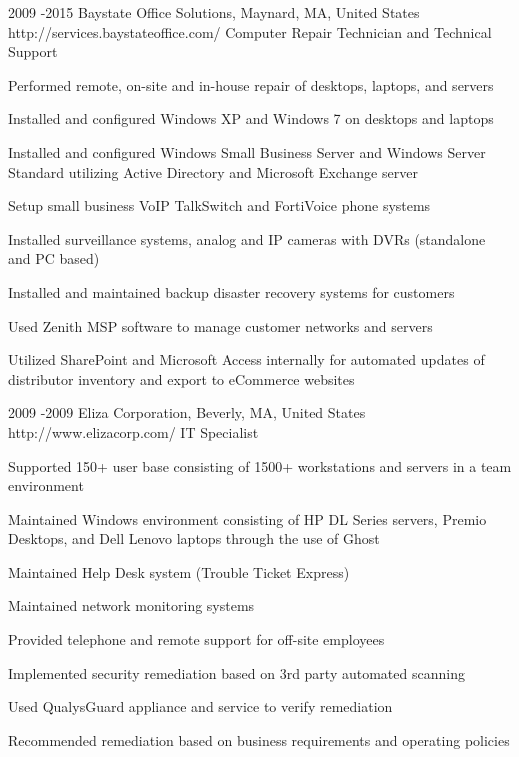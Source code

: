 \documentclass[10pt]{article} %
\begin{document}
\job
{2009 -}{2015}
{Baystate Office Solutions, Maynard, MA, United States}
{http://services.baystateoffice.com/}
{Computer Repair Technician and Technical Support}
{\begin{itemize-noindent}
\item{Performed remote, on-site and in-house repair of desktops, laptops, and servers}
\item{Installed and configured Windows XP and Windows 7 on desktops and laptops}
\item{Installed and configured Windows Small Business Server and Windows Server Standard utilizing Active Directory and Microsoft Exchange server}
\item{Setup small business VoIP TalkSwitch and FortiVoice phone systems}
\item{Installed surveillance systems, analog and IP cameras with DVRs (standalone and PC based)}
\item{Installed and maintained backup disaster recovery systems for customers}
\item{Used Zenith MSP software to manage customer networks and servers}
\item{Utilized SharePoint and Microsoft Access internally for automated updates of distributor inventory and export to eCommerce websites}
\end{itemize-noindent}}


\job
{2009 -}{2009}
{Eliza Corporation, Beverly, MA, United States}
{http://www.elizacorp.com/}
{IT Specialist}
{\begin{itemize-noindent}
\item{Supported 150+ user base consisting of 1500+ workstations and servers in a team environment}
\item{Maintained Windows environment consisting of HP DL Series servers, Premio Desktops, and Dell Lenovo laptops through the use of Ghost}
\item{Maintained Help Desk system (Trouble Ticket Express)}
\item{Maintained network monitoring systems}
\item{Provided telephone and remote support for off-site employees}
\item{Implemented security remediation based on 3rd party automated scanning}
\item{Used QualysGuard appliance and service to verify remediation}
\item{Recommended remediation based on business requirements and operating policies}
\end{itemize-noindent}}
\end{document}

